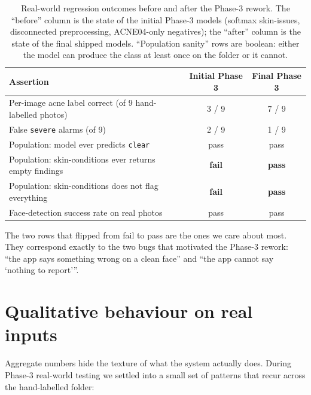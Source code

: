 \documentclass[11pt,a4paper,oneside]{report}
\begin{document}
\begin{table}[htbp]
    \centering
    \caption{Real-world regression outcomes before and after the
    Phase-3 rework. The ``before'' column is the state of the
    initial Phase-3 models (softmax skin-issues, disconnected
    preprocessing, ACNE04-only negatives); the ``after'' column is
    the state of the final shipped models. ``Population sanity''
    rows are boolean: either the model can produce the class at
    least once on the folder or it cannot.}
    \label{tab:regression-results}
    \small
    \begin{tabularx}{\linewidth}{Xcc}
        \toprule
        \textbf{Assertion} & \textbf{Initial Phase 3} & \textbf{Final Phase 3} \\
        \midrule
        Per-image acne label correct (of 9 hand-labelled photos) & 3 / 9 & 7 / 9 \\
        False \texttt{severe} alarms (of 9)                      & 2 / 9 & 1 / 9 \\
        Population: model ever predicts \texttt{clear}           & pass  & pass  \\
        Population: skin-conditions ever returns empty findings  & \textbf{fail} & \textbf{pass} \\
        Population: skin-conditions does not flag everything     & \textbf{fail} & \textbf{pass} \\
        Face-detection success rate on real photos               & pass  & pass  \\
        \bottomrule
    \end{tabularx}
\end{table}

The two rows that flipped from fail to pass are the ones we care
about most. They correspond exactly to the two bugs that motivated
the Phase-3 rework: ``the app says something wrong on a clean
face'' and ``the app cannot say `nothing to report'''.

\section{Qualitative behaviour on real inputs}

Aggregate numbers hide the texture of what the system actually
does. During Phase-3 real-world testing we settled into a small
set of patterns that recur across the hand-labelled folder:
\end{document}
